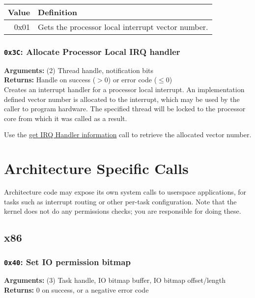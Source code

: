 \documentclass[11pt]{article}
\begin{document}
\begin{table}[h]
\begin{tabular}{|r|l|}
\hline
\rowcolor[HTML]{EFEFEF} 
\cellcolor[HTML]{EFEFEF}\textbf{Value} & \textbf{Definition} \\ \hline
0x01 & Gets the processor local interrupt vector number. \\ \hline
\end{tabular}
\end{table}

\subsubsection{{\tt 0x3C}: Allocate Processor Local IRQ handler}
\textbf{Arguments:} (2) Thread handle, notification bits \\
\textbf{Returns:} Handle on success ($> 0$) or error code ($\leq0$) \\

Creates an interrupt handler for a processor local interrupt. An implementation defined vector number is allocated to the interrupt, which may be used by the caller to program hardware. The specified thread will be locked to the processor core from which it was called as a result.

Use the \hyperlink{section.3.6.4}{get IRQ Handler information} call to retrieve the allocated vector number.

\newpage
\section{Architecture Specific Calls}
Architecture code may expose its own system calls to userspace applications, for tasks such as interrupt routing or other per-task configuration. Note that the kernel does not do any permissions checks; you are responsible for doing these.

\subsection{x86}
\subsubsection{{\tt 0x40}: Set IO permission bitmap}
\textbf{Arguments:} (3) Task handle, IO bitmap buffer, IO bitmap offset/length \\
\textbf{Returns:} 0 on success, or a negative error code \\
\end{document}

